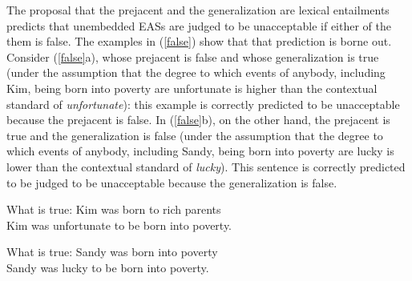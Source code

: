 \documentclass[11pt,fleqn]{article}
\def\infelic{{\leavevmode\llap{\#}}}
\newcommand{\6}{\mbox{$[\hspace*{-.6mm}[$}}
\newcommand{\9}{\mbox{$]\hspace*{-.6mm}]$}}
\begin{document}
The proposal that the prejacent and the generalization are lexical entailments predicts that unembedded EASs are judged to be unacceptable if either of the them is false. The examples in (\ref{false}) show that that prediction is borne out. Consider (\ref{false}a), whose prejacent is false and whose generalization is true (under the assumption that the degree to which events of anybody, including Kim, being born into poverty are unfortunate is higher than the contextual standard of {\em unfortunate}): this example is correctly predicted to be unacceptable because the prejacent is false. In (\ref{false}b), on the other hand, the prejacent is true and the generalization is false (under the assumption that the degree to which events of anybody, including Sandy, being born into poverty are lucky is lower than the contextual standard of {\em lucky}). This sentence is correctly predicted to be judged to be unacceptable because the generalization is false. 

\begin{exe}
\ex\label{false}
\begin{xlist}
\ex What is true: Kim was born to rich parents
\\ \infelic Kim was unfortunate to be born into poverty.

\ex What is true: Sandy was born into poverty
\\ \infelic Sandy was lucky to be born into poverty.

\end{xlist}
\end{exe}

\end{document}
